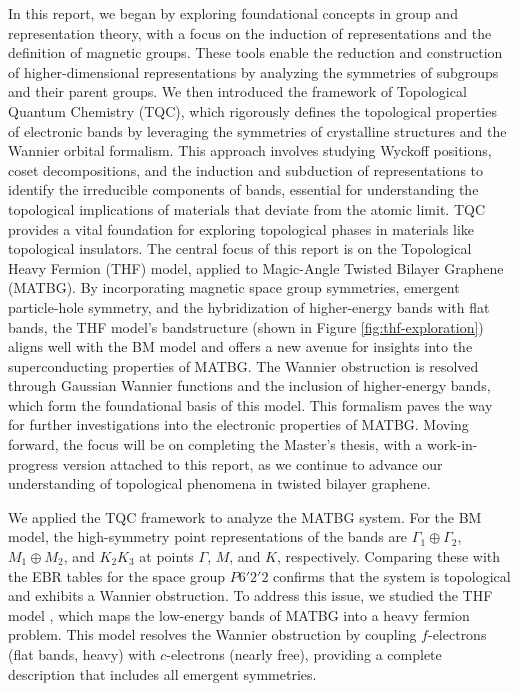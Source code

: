 In this report, we began by exploring foundational concepts in group and representation theory, with a focus on the induction of representations and the definition of magnetic groups. These tools enable the reduction and construction of higher-dimensional representations by analyzing the symmetries of subgroups and their parent groups. We then introduced the framework of Topological Quantum Chemistry (TQC), which rigorously defines the topological properties of electronic bands by leveraging the symmetries of crystalline structures and the Wannier orbital formalism. This approach involves studying Wyckoff positions, coset decompositions, and the induction and subduction of representations to identify the irreducible components of bands, essential for understanding the topological implications of materials that deviate from the atomic limit. TQC provides a vital foundation for exploring topological phases in materials like topological insulators. The central focus of this report is on the Topological Heavy Fermion (THF) model, applied to Magic-Angle Twisted Bilayer Graphene (MATBG). By incorporating magnetic space group symmetries, emergent particle-hole symmetry, and the hybridization of higher-energy bands with flat bands, the THF model’s bandstructure (shown in Figure \ref{fig:thf-exploration}) aligns well with the BM model \cite{macdonald2011, topoheavyfermion2022} and offers a new avenue for insights into the superconducting properties of MATBG. The Wannier obstruction is resolved through Gaussian Wannier functions and the inclusion of higher-energy bands, which form the foundational basis of this model. This formalism paves the way for further investigations into the electronic properties of MATBG. Moving forward, the focus will be on completing the Master's thesis, with a work-in-progress version attached to this report, as we continue to advance our understanding of topological phenomena in twisted bilayer graphene.

We applied the TQC framework to analyze the MATBG system. For the BM model, the high-symmetry point representations of the bands are \( \Gamma_1 \oplus \Gamma_2 \), \( M_1 \oplus M_2 \), and \( K_2 K_3 \) \cite{all_magic_angles, bernevig_II_2021} at points \( \Gamma \), \( M \), and \( K \), respectively. Comparing these with the EBR tables for the space group \( P6'2'2 \) confirms that the system is topological and exhibits a Wannier obstruction. To address this issue, we studied the THF model \cite{topoheavyfermion2022}, which maps the low-energy bands of MATBG into a heavy fermion problem. This model resolves the Wannier obstruction by coupling \( f \)-electrons (flat bands, heavy) with \( c \)-electrons (nearly free), providing a complete description that includes all emergent symmetries.



